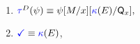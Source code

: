 \begin{multicols}{2}
\begin{enumerate}[topsep=0pt,label=(\textsc{w}\arabic*),ref=\textsc{w}\arabic*]
    
  \item \label{write-tau-ca}
    \begin{math}
      \aTr{\bEvs}{\bForm} \riff
      \bForm
      [\aExp/\aLoc][{\kappaE{}}/\Q{\aLoc}], %
    \end{math}
  \item \label{write-term-ca}
    $\aTerm \riff \kappaE{}$, %

\end{enumerate}
\end{multicols}
